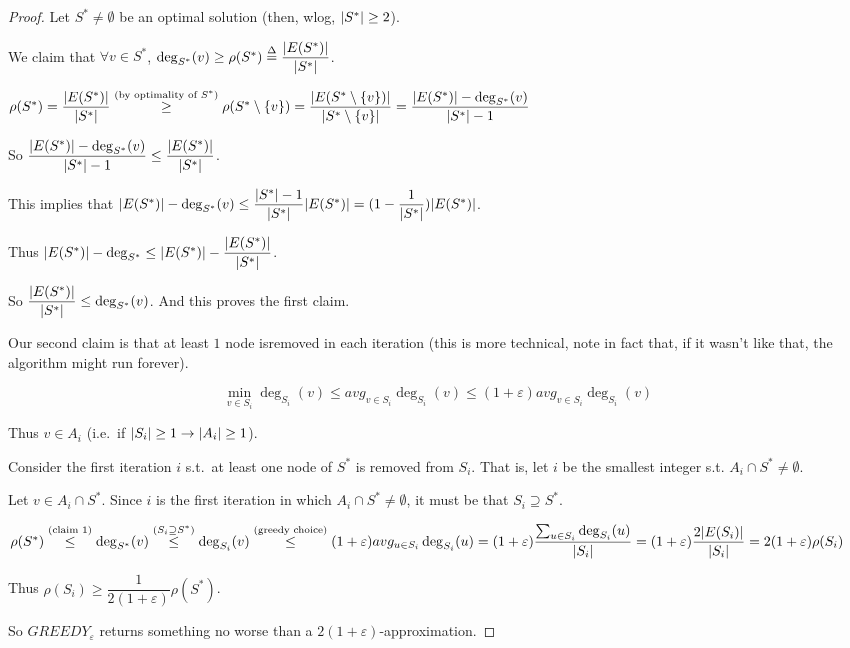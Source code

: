     \begin{proof}
        Let $S^* \neq \emptyset$ be an optimal solution (then, wlog, $\vert S^* \vert \geq 2$).

        We claim that $\forall v \in S^*$, $\deg_{S^*}(v) \geq \rho(S^*) \overset{\Delta}{=} \dfrac{\vert E(S^*) \vert}{\vert S^* \vert}$.

        $\rho(S^*) = \dfrac{\vert E(S^*) \vert}{\vert S^* \vert} \overset{(\text{by optimality of }S^*)}{\geq} \rho(S^* \setminus \{v\}) = 
        \dfrac{\vert E(S^* \setminus \{v\}) \vert}{\vert S^* \setminus \{v\} \vert} = 
        \dfrac{\vert E(S^*) \vert - \deg_{S^*}(v)}{\vert S^* \vert-1}$

        So $\dfrac{\vert E(S^*) \vert - \deg_{S^*}(v)}{\vert S^* \vert-1} \leq \dfrac{\vert E(S^*) \vert}{\vert S^* \vert}$.

        This implies that $\vert E(S^*) \vert - \deg_{S^*}(v) \leq \dfrac{\vert S^* \vert-1}{\vert S^* \vert} \vert E(S^*) \vert = (1 - \dfrac{1}{\vert S^* \vert}) \vert E(S^*) \vert$.

        Thus $\vert E(S^*) \vert - \deg_{S^*} \leq \vert E(S^*) \vert - \dfrac{\vert E(S^*) \vert }{\vert S^* \vert}$.

        So $\dfrac{\vert E(S^*) \vert }{\vert S^* \vert} \leq \deg_{S^*}(v)$. And this proves the first claim.

        Our second claim is that at least $1$ node isremoved in each iteration (this is more technical, note in fact that, if it wasn't like that, the algorithm might run forever).

        \[ \min_{v \in S_i} \deg_{S_i}(v) \leq avg_{v \in S_i} \deg_{S_i}(v) \leq (1+\varepsilon)avg_{v \in S_i} \deg_{S_i}(v) \]

        Thus $v \in A_i$ (i.e.~if $\vert S_i \vert \geq 1 \rightarrow \vert A_i \vert \geq 1$).

        Consider the first iteration $i$ s.t.~at least one node of $S^*$ is removed from $S_i$.
        That is, let $i$ be the smallest integer s.t. $A_i \cap S^* \neq \emptyset$.

        Let $v \in A_i \cap S^*$. Since $i$ is the first iteration in which $A_i \cap S^* \neq \emptyset$, it must be that $S_i \supseteq S^*$.

        $\rho(S^*) \overset{(\text{claim 1})}{\leq}
        \deg_{S^*}(v) \overset{(S_i \supseteq S^*)}{\leq}
        \deg_{S_i}(v) \overset{(\text{greedy choice})}{\leq}
        (1+\varepsilon) avg_{u \in S_i} \deg_{S_i}(u) = 
        (1+\varepsilon) \dfrac{\sum_{u \in S_i} \deg_{S_i}(u)}{\vert S_i \vert} =
        (1+\varepsilon) \dfrac{2 \vert E(S_i) \vert}{\vert S_i \vert} = 
        2 (1+\varepsilon) \rho(S_i)
        $

        Thus $\rho(S_i) \geq \dfrac{1}{2(1+\varepsilon)} \rho(S^*)$.

        So $GREEDY_\varepsilon$ returns something no worse than a $2(1+\varepsilon)$-approximation.
    \end{proof}

